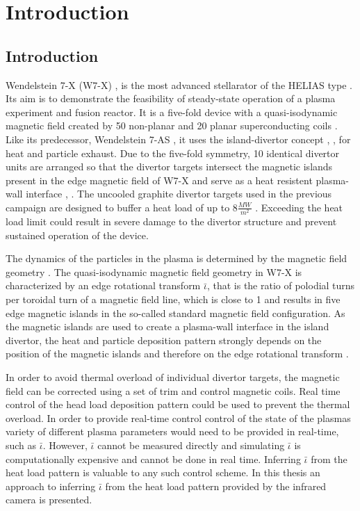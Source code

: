 %
\chapter{Introduction}
\label{sec:intro}

\section{Introduction}
Wendelstein 7-X (W7-X) \cite{Beidler1990},\cite{Klinger2013} is the most advanced stellarator of the HELIAS type \cite{Nuhrenberg1986}. Its aim is to demonstrate the feasibility of steady-state operation of a plasma experiment and fusion reactor. It is a five-fold device with a quasi-isodynamic magnetic field created by 50 non-planar and 20 planar superconducting coils \cite{Rummel2012}. Like its predecessor, Wendelstein 7-AS \cite{Hirsch2008}, it uses the island-divertor concept \cite{Renner2004}, \cite{Konig2002}, \cite{Grigull2001} for heat and particle exhaust. Due to the five-fold symmetry, 10 identical divertor units are arranged so that the divertor targets intersect the magnetic islands present in the edge magnetic field of W7-X and serve as a heat resistent plasma-wall interface \cite{Boscary2021}, \cite{Boscary2017}. The uncooled graphite divertor targets used in the previous campaign \cite{Pedersen2019} are designed to buffer a heat load of up to $8 \frac{MW}{m^2}$ \cite{Gao2019}. Exceeding the heat load limit could result in severe damage to the divertor structure and prevent sustained operation of the device.

The dynamics of the particles in the plasma is determined by the magnetic field geometry \cite{Helander2014}. The quasi-isodynamic magnetic field geometry in W7-X is characterized by an edge rotational transform $\bar{\iota}$, that is the ratio of polodial turns per toroidal turn of a magnetic field line, which is close to 1 and results in five edge magnetic islands in the so-called standard magnetic field configuration. As the magnetic islands are used to create a plasma-wall interface in the island divertor, the heat and particle deposition pattern strongly depends on the position of the magnetic islands and therefore on the edge rotational transform \cite{Lazerson2019}.

In order to avoid thermal overload of individual divertor targets, the magnetic field can be corrected using a set of trim and control magnetic coils. Real time control of the head load deposition pattern could be used to prevent the thermal overload. In order to provide real-time control control of the state of the plasmas variety of different plasma parameters would need to be provided in real-time, such as $\bar{\iota}$. However, $\bar{\iota}$ cannot be measured directly and simulating $\bar{\iota}$ is computationally expensive and cannot be done in real time. Inferring $\bar{\iota}$ from the heat load pattern is valuable to any such control scheme. In this thesis an approach to inferring $\bar{\iota}$ from the heat load pattern provided by the infrared camera is presented.

